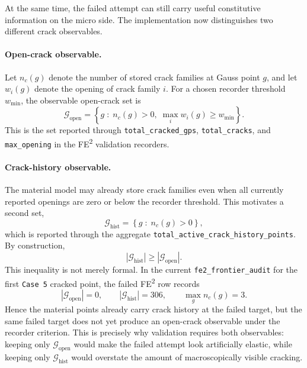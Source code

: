At the same time, the failed attempt can still carry useful constitutive
information on the micro side.  The implementation now distinguishes two
different crack observables.

\paragraph{Open-crack observable.}
Let \(n_c(g)\) denote the number of stored crack families at Gauss point
\(g\), and let \(w_i(g)\) denote the opening of crack family \(i\).  For a
chosen recorder threshold \(w_{\min}\), the observable open-crack set is
\begin{equation}
  \mathcal{G}_{\mathrm{open}}
  =
  \left\{
    g \;:\;
    n_c(g) > 0,\;
    \max_i w_i(g) \ge w_{\min}
  \right\}.
  \label{eq:ms-pub-open-crack-set}
\end{equation}
This is the set reported through \texttt{total\_cracked\_gps},
\texttt{total\_cracks}, and \texttt{max\_opening} in the FE\textsuperscript{2}
validation recorders.

\paragraph{Crack-history observable.}
The material model may already store crack families even when all currently
reported openings are zero or below the recorder threshold.  This motivates a
second set,
\begin{equation}
  \mathcal{G}_{\mathrm{hist}}
  =
  \left\{
    g \;:\;
    n_c(g) > 0
  \right\},
  \label{eq:ms-pub-crack-history-set}
\end{equation}
which is reported through the aggregate
\texttt{total\_active\_crack\_history\_points}.  By construction,
\begin{equation}
  \left|\mathcal{G}_{\mathrm{hist}}\right|
  \ge
  \left|\mathcal{G}_{\mathrm{open}}\right|.
  \label{eq:ms-pub-crack-history-dominates-open}
\end{equation}
This inequality is not merely formal.  In the current
\texttt{fe2\_frontier\_audit} for the first \texttt{Case~5} cracked point, the
failed FE\textsuperscript{2} row records
\begin{equation}
  \left|\mathcal{G}_{\mathrm{open}}\right| = 0,
  \qquad
  \left|\mathcal{G}_{\mathrm{hist}}\right| = 306,
  \qquad
  \max_g n_c(g) = 3.
  \label{eq:ms-pub-frontier-audit-observable-split}
\end{equation}
Hence the material points already carry crack history at the failed target,
but the same failed target does not yet produce an open-crack observable under
the recorder criterion.  This is precisely why validation requires both
observables: keeping only \(\mathcal{G}_{\mathrm{open}}\) would make the failed
attempt look artificially elastic, while keeping only
\(\mathcal{G}_{\mathrm{hist}}\) would overstate the amount of macroscopically
visible cracking.

